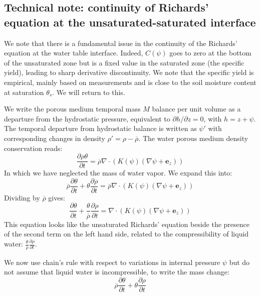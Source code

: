 \documentclass{article}
\begin{document}
\subsection{Technical note: continuity of Richards' equation at the unsaturated-saturated interface}
We note that there is a fundamental issue in the continuity of the Richards' equation at the water table interface. Indeed, $C(\psi)$ goes to zero at the bottom of the unsaturated zone but is a fixed value in the saturated zone (the specific yield), leading to sharp derivative discontinuity. We note that the specific yield is empirical, mainly based on measurements and is close to the soil moisture content at saturation $\theta_s$. We will return to this.

We write the porous medium temporal mass $M$ balance per unit volume as a departure from the hydrostatic pressure, equivalent to $\partial h/\partial z=0$, with $h=z+\psi$. The temporal departure from hydrostatic balance is written as $\psi'$ with corresponding changes in density $\rho'=\rho-\overline\rho$. The water porous medium density conservation reads:
\begin{equation}
\frac{\partial \rho \theta}{\partial t} = {\overline{\rho}} \nabla \cdot \left( K(\psi) \left( \nabla \psi + {\mathbf e_z} \right) \right)
\end{equation}
In which we have neglected the mass of water vapor.
We expand this into:
\begin{equation}
{\overline \rho} \frac{\partial \theta}{\partial t} + \theta \frac{\partial \rho}{\partial t} = {\overline \rho} \nabla \cdot \left( K(\psi) \left( \nabla \psi + {\mathbf e_z} \right) \right)
\end{equation}
Dividing by $\overline \rho$ gives:
\begin{equation}
\frac{\partial \theta}{\partial t} + \frac{\theta}{\overline \rho} \frac{\partial \rho}{\partial t} = \nabla \cdot \left( K(\psi) \left( \nabla \psi + {\mathbf e_z} \right) \right)
\end{equation}
This equation looks like the unsaturated Richards’ equation beside the presence of the second term on the left hand side, related to the compressibility of liquid water: $ \frac{\theta}{\overline \rho} \frac{\partial \rho}{\partial t}$.

We now use chain’s rule with respect to variations in internal pressure $\psi$ but do not assume that liquid water is incompressible, to write the mass change:
\begin{equation}
{\overline \rho} \frac{\partial \theta}{\partial t} + \theta \frac{\partial \rho}{\partial t} 
\end{equation}
\end{document}
